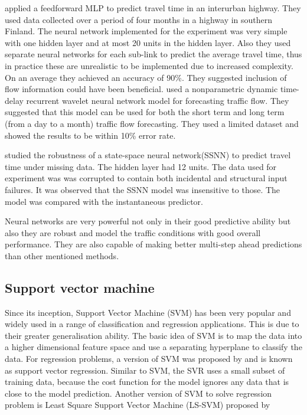 \citet{innamaa2005short} applied a feedforward MLP to predict travel time in an interurban highway.
They used data collected over a period of four months in a highway in southern Finland. The neural
network implemented for the experiment was very simple with one hidden layer and at most 20 units in
the hidden layer. Also they used separate neural networks for each sub-link to predict the average
travel time, thus in practice these are unrealistic to be implemented due to increased complexity.
On an average they achieved an accuracy of 90\%. They suggested inclusion of flow information could
have been beneficial. \citet{jiang2005dynamic} used a nonparametric dynamic time-delay recurrent
wavelet neural network model for forecasting traffic flow. They suggested that this model can be
used for both the short term and long term (from a day to a month) traffic flow forecasting. They
used a limited dataset and showed the results to be within 10\% error rate.

\citet{van2005accurate} studied the robustness of a state-space neural network(SSNN) to predict
travel time under missing data. The hidden layer had 12 units. The data used for experiment was
was corrupted to contain both incidental and structural input failures. It was observed that the
SSNN model was insensitive to those. The model was compared with the instantaneous predictor.


Neural networks are very powerful not only in their good predictive ability but also they are robust
and model the traffic conditions with good overall performance. They are also capable of making
better multi-step ahead predictions than other mentioned methods.

\subsection{Support vector machine}
Since its inception, Support Vector Machine (SVM) has been very popular and widely used in a range of
classification and regression applications. This is due to their greater generalisation ability.
The basic idea of SVM is to map the data into a higher dimensional feature space and use a separating
hyperplane to classify the data. For regression problems, a version of SVM was proposed by
\citet{smola1997support} and is known as support vector regression. Similar to SVM, the SVR uses
a small subset of training data, because the cost function for the model ignores any data that is
close to the model prediction. Another version of SVM to solve regression problem is Least
Square Support Vector Machine (LS-SVM) proposed by \cite{suykens2002least}


